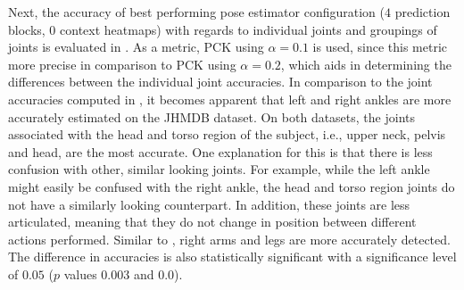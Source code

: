 Next, the accuracy of best performing pose estimator configuration ($4$ prediction blocks, $0$ context heatmaps) with regards to individual joints and groupings of joints is evaluated in .
As a metric, PCK using $\alpha = 0.1$ is used, since this metric more precise in comparison to PCK using $\alpha = 0.2$, which aids in determining the differences between the individual joint accuracies.
In comparison to the joint accuracies computed in , it becomes apparent that left and right ankles are more accurately estimated on the JHMDB dataset.
On both datasets, the joints associated with the head and torso region of the subject, i.e., upper neck, pelvis and head, are the most accurate.
One explanation for this is that there is less confusion with other, similar looking joints.
For example, while the left ankle might easily be confused with the right ankle, the head and torso region joints do not have a similarly looking counterpart.
In addition, these joints are less articulated, meaning that they do not change in position between different actions performed.
Similar to , right arms and legs are more accurately detected.
The difference in accuracies is also statistically significant with a significance level of $0.05$ ($p$ values $0.003$ and $0.0$).

